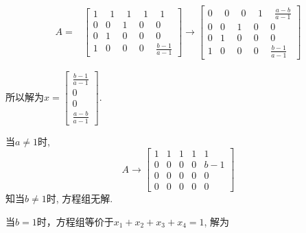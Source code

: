 \begin{displaymath}
\begin{aligned}
A=&\begin{bmatrix} 1&\ \ 1&\ \ 1&\ \ 1&\ \ 1\\0&0&1&0&0\\0&1&0&0&0\\1&0&0&0&\frac{b-1}{a-1} \end{bmatrix}\rightarrow
\begin{bmatrix}0&\ \ 0&\ \ 0& \ \ 1&\ \ \frac{a-b}{a-1}\\0&0&1&0&0\\0&1&0&0&0\\1&0&0&0&\frac{b-1}{a-1}  \end{bmatrix} \end{aligned} \end{displaymath}

所以解为$x=\begin{bmatrix}\frac{b-1}{a-1}\\0\\0\\ \frac{a-b}{a-1}\end{bmatrix}.$

当$a\not=1$时, $$A\rightarrow \begin{bmatrix}1&1&1&1&1\\0&0&0&0&b-1\\0&0&0&0&0\\0&0&0&0&0\end{bmatrix}$$
知当$b\not=1$时, 方程组无解.

当$b=1$时，方程组等价于$x_1+x_2+x_3+x_4=1$, 解为

